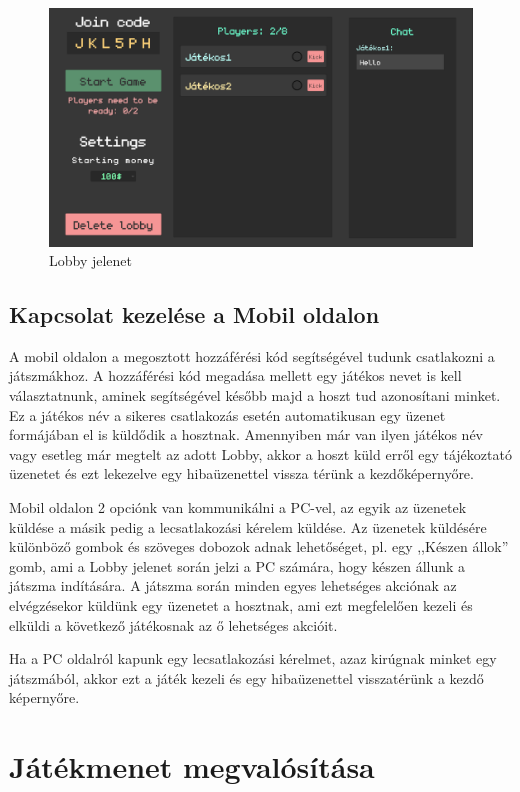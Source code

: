 \documentclass[]{thesis-ekf}
\theoremstyle{definition}
\theoremstyle{remark}
\begin{document}
\begin{figure}[ht!]
	\centering
	\includegraphics[width=16cm]{Lobby}
	\caption{Lobby jelenet}
	\label{fig-lobby}
\end{figure}

\subsection{Kapcsolat kezelése a Mobil oldalon}

A mobil oldalon a megosztott hozzáférési kód segítségével tudunk csatlakozni a játszmákhoz. A hozzáférési kód megadása mellett egy játékos nevet is kell választatnunk, aminek segítségével később majd a hoszt tud azonosítani minket. Ez a játékos név a sikeres csatlakozás esetén automatikusan egy üzenet formájában el is küldődik a hosztnak. Amennyiben már van ilyen játékos név vagy esetleg már megtelt az adott Lobby, akkor a hoszt küld erről egy tájékoztató üzenetet és ezt lekezelve egy hibaüzenettel vissza térünk a kezdőképernyőre.

Mobil oldalon 2 opciónk van kommunikálni a PC-vel, az egyik az üzenetek küldése a másik pedig a lecsatlakozási kérelem küldése. Az üzenetek küldésére különböző gombok és szöveges dobozok adnak lehetőséget, pl. egy ,,Készen állok'' gomb, ami a Lobby jelenet során jelzi a PC számára, hogy készen állunk a játszma indítására. A játszma során minden egyes lehetséges akciónak az elvégzésekor küldünk egy üzenetet a hosztnak, ami ezt megfelelően kezeli és elküldi a következő játékosnak az ő lehetséges akcióit.

Ha a PC oldalról kapunk egy lecsatlakozási kérelmet, azaz kirúgnak minket egy játszmából, akkor ezt a játék kezeli és egy hibaüzenettel visszatérünk a kezdő képernyőre.

\section{Játékmenet megvalósítása}
\end{document}
